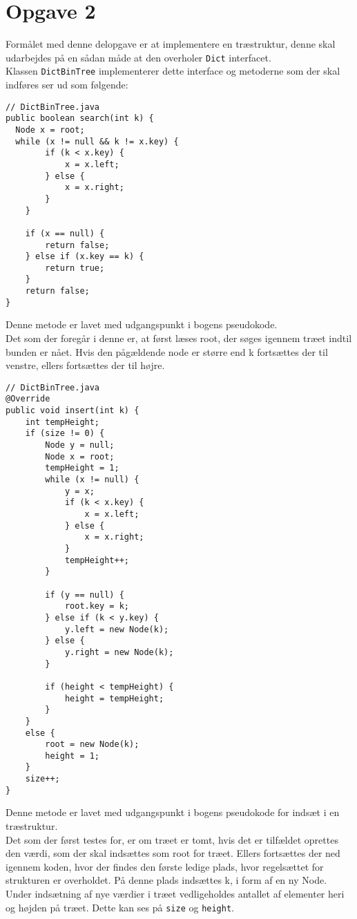 \documentclass{article}
\begin{document}
\section*{Opgave 2}
Formålet med denne delopgave er at implementere en træstruktur, denne skal udarbejdes på en sådan måde at den overholer \texttt{Dict} interfacet.\\
Klassen \texttt{DictBinTree} implementerer dette interface og metoderne som der skal indføres ser ud som følgende:
\begin{lstlisting}
// DictBinTree.java
public boolean search(int k) {
  Node x = root;
  while (x != null && k != x.key) {
        if (k < x.key) {
            x = x.left;
        } else {
            x = x.right;
        }
    }

    if (x == null) {
        return false;
    } else if (x.key == k) {
        return true;
    }
    return false;
}
\end{lstlisting}
\bigskip
Denne metode er lavet med udgangspunkt i bogens pseudokode.\\
Det som der foregår i denne er, at først læses root, der søges igennem træet indtil bunden er nået. Hvis den pågældende node er større end k fortsættes der til venstre, ellers fortsættes der til højre.\\
\newpage
\begin{lstlisting}
// DictBinTree.java
@Override
public void insert(int k) {
	int tempHeight;
	if (size != 0) {
		Node y = null;
       	Node x = root;
		tempHeight = 1;
		while (x != null) {
			y = x;
			if (k < x.key) {
				x = x.left;
			} else {
				x = x.right;
			}
			tempHeight++;
        }
		
		if (y == null) {
			root.key = k;
		} else if (k < y.key) {
			y.left = new Node(k);
		} else {
			y.right = new Node(k);
		}
            
		if (height < tempHeight) {
			height = tempHeight;
		}
	}
	else {
		root = new Node(k);
		height = 1;
	}
	size++;
}
\end{lstlisting}
\bigskip
Denne metode er lavet med udgangspunkt i bogens pseudokode for indsæt i en træstruktur.\\
Det som der først testes for, er om træet er tomt, hvis det er tilfældet oprettes den værdi, som der skal indsættes som root for træet. Ellers fortsættes der ned igennem koden, hvor der findes den første ledige plads, hvor regelsættet for strukturen er overholdet. På denne plads indsættes k, i form af en ny Node.\\
Under indsætning af nye værdier i træet vedligeholdes antallet af elementer heri og højden på træet. Dette kan ses på \texttt{size} og \texttt{height}.
\end{document}
